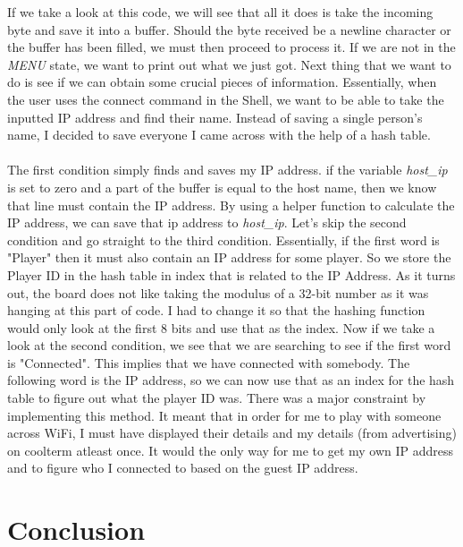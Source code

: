 \documentclass[a4paper, 12pt]{article}
\begin{document}
    If we take a look at this code, we will see that all it does is take the
    incoming byte and save it into a buffer. Should the byte received be a
    newline character or the buffer has been filled, we must then proceed to
    process it. If we are not in the \textit{MENU} state, we want to print out
    what we just got. Next thing that we want to do is see if we can obtain
    some crucial pieces of information. Essentially, when the user uses the
    connect command in the Shell, we want to be able to take the inputted IP
    address and find their name. Instead of saving a single person's name, I
    decided to save everyone I came across with the help of a hash table.
    \\ \\
    The first condition simply finds and saves my IP address. if the variable
    \textit{host\_ip} is set to zero and a part of the buffer is equal to
    the host name, then we know that line must contain the IP address. By using
    a helper function to calculate the IP address, we can save that ip address
    to \textit{host\_ip}. Let's skip the second condition and go straight to
    the third condition. Essentially, if the first word is "Player" then it
    must also contain an IP address for some player. So we store the Player ID
    in the hash table in index that is related to the IP Address. As it turns
    out, the board does not like taking the modulus of a 32-bit number as it
    was hanging at this part of code. I had to change it so that the hashing
    function would only look at the first 8 bits and use that as the index.
    Now if we take a look at the second condition, we see that we are searching
    to see if the first word is "Connected". This implies that we have connected
    with somebody. The following word is the IP address, so we can now use that
    as an index for the hash table to figure out what the player ID was. There
    was a major constraint by implementing this method. It meant that in order
    for me to play with someone across WiFi, I must have displayed
    their details and my details (from advertising) on coolterm atleast once.
    It would the only way for me to get my own IP address and to figure who I
    connected to based on the guest IP address.


    \section{Conclusion}
\end{document}
